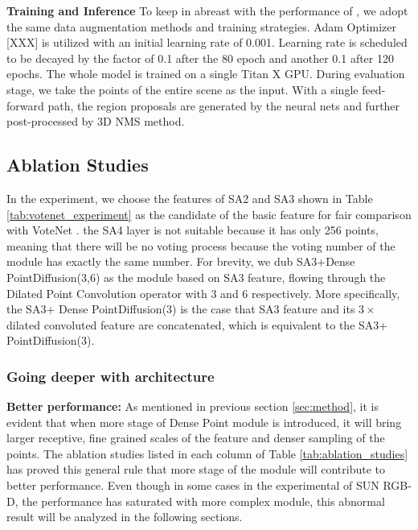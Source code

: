 \documentclass[runningheads]{llncs}
\begin{document}
\noindent\textbf{Training and Inference}
To keep in abreast with the performance of \cite{VoteNet}, we adopt the same data augmentation methods and training strategies. Adam Optimizer [XXX] is utilized with an initial learning rate of 0.001. Learning rate is scheduled to be decayed by the factor of 0.1 after the 80 epoch and another 0.1 after 120 epochs. The whole model is trained on a single Titan X GPU.
During evaluation stage, we take the points of the entire scene as the input. With a single feed-forward path, the region proposals are generated by the neural nets and further post-processed by 3D NMS method.

\subsection{Ablation Studies}
In the experiment, we choose the features of SA2 and SA3 shown in Table \ref{tab:votenet_experiment} as the candidate of the basic feature for fair comparison with VoteNet \cite{VoteNet}. the SA4 layer is not suitable because it has only 256 points, meaning that there will be no voting process because the voting number of the module has exactly the same number.%
For brevity, we dub SA3+Dense PointDiffusion(3,6) as the module based on SA3 feature, flowing through the Dilated Point Convolution operator with 3 and 6 respectively. More specifically, the SA3+ Dense PointDiffusion(3) is the case that SA3 feature and its $3\times$ dilated convoluted feature are concatenated, which is equivalent to the SA3+ PointDiffusion(3). 


\subsubsection{Going deeper with architecture}
\textbf{Better performance:}
As  mentioned in previous section \ref{sec:method}, it is evident that when more stage of Dense Point module is introduced, it will bring larger receptive, fine grained scales of the feature and denser sampling of the points.  The ablation studies listed in each column of Table \ref{tab:ablation_studies} has proved this general rule that more stage of the module will contribute to better performance.  Even though in some  cases in the experimental of SUN RGB-D\cite{SUN_RGBD}, the performance has saturated with more complex module, this abnormal result will be analyzed in the following sections.  
\end{document}
